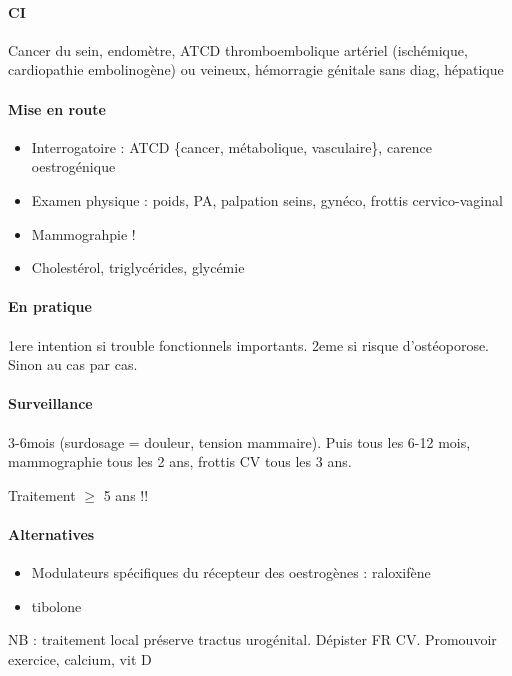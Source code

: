 \documentclass[11pt]{article}
\begin{document}
\paragraph{CI}
\label{sec:org47afd2b}
Cancer du sein, endomètre, ATCD thromboembolique artériel (ischémique,
cardiopathie embolinogène) ou veineux, hémorragie génitale sans diag, hépatique

\paragraph{Mise en route}
\label{sec:orga92eb41}
\begin{itemize}
\item Interrogatoire : ATCD \{cancer, métabolique, vasculaire\}, carence oestrogénique
\item Examen physique : poids, PA, palpation seins, gynéco, frottis cervico-vaginal
\item Mammograhpie !
\item Cholestérol, triglycérides, glycémie
\end{itemize}

\paragraph{En pratique}
\label{sec:orgc46dde7}
1ere intention si trouble fonctionnels importants. 2eme si risque
d'ostéoporose. Sinon au cas par cas.

\paragraph{Surveillance}
\label{sec:org8ca1fca}
3-6mois (surdosage = douleur, tension mammaire). Puis tous les 6-12 mois,
mammographie tous les 2 ans, frottis CV tous les 3 ans.

Traitement \(\ge\) 5 ans !!

\paragraph{Alternatives}
\label{sec:org7a0d3d6}
\begin{itemize}
\item Modulateurs spécifiques du récepteur des oestrogènes : raloxifène
\item tibolone
\end{itemize}

NB : traitement local préserve tractus urogénital. Dépister FR CV. Promouvoir
exercice, calcium, vit D
\end{document}

